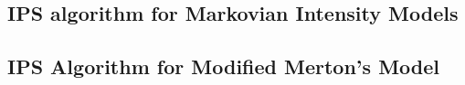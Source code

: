 \subsection{IPS algorithm for Markovian Intensity Models}

\subsection{IPS Algorithm for Modified Merton's Model}

